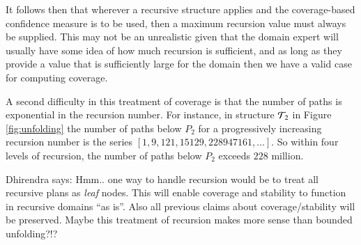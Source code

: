 It follows then that wherever a recursive structure applies and the coverage-based confidence measure is to be used, then a maximum recursion value must always be supplied. This may not be an unrealistic given that the domain expert will usually have some idea of how much recursion is sufficient, and as long as they provide a value that is sufficiently large for the domain then we have a valid case for computing coverage.

A second difficulty in this treatment of coverage is that the number of paths is exponential in the recursion number. For instance, in structure ${\mathcal{T}}_2$ in Figure \ref{fig:unfolding} the number of paths below $P_2$ for a progressively increasing recursion number is the series $[1, 9, 121, 15129, 228947161, \ldots]$. So within four levels of recursion, the number of paths below $P_2$ exceeds $228$ million.

Dhirendra says: Hmm.. one way to handle recursion would be to treat all recursive plans as \textit{leaf} nodes. This will enable coverage and stability to function in recursive domains ``as is''. Also all previous claims about coverage/stability will be preserved. Maybe this treatment of recursion makes more sense than bounded unfolding?!?


